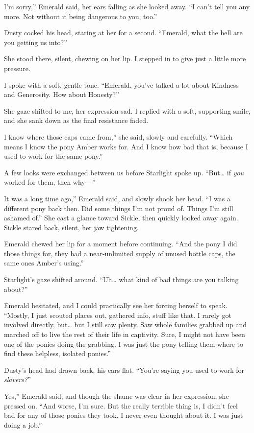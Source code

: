 \leavevmode{}I’m sorry,” Emerald said, her ears falling as she looked away. “I can’t tell you any more. Not without it being dangerous to you, too.”

Dusty cocked his head, staring at her for a second. “Emerald, what the hell are you getting us into?”

She stood there, silent, chewing on her lip. I stepped in to give just a little more pressure.

I spoke with a soft, gentle tone. “Emerald, you’ve talked a lot about Kindness and Generosity. How about Honesty?”

She gaze shifted to me, her expression sad. I replied with a soft, supporting smile, and she sank down as the final resistance faded.

\leavevmode{}I know where those caps came from,” she said, slowly and carefully. “Which means I know the pony Amber works for. And I know how bad that is, because I used to work for the same pony.”

A few looks were exchanged between us before Starlight spoke up. “But… if \textit{you} worked for them, then why—”

\leavevmode{}It was a long time ago,” Emerald said, and slowly shook her head. “I was a different pony back then. Did some things I’m not proud of. Things I’m still ashamed of.” She cast a glance toward Sickle, then quickly looked away again. Sickle stared back, silent, her jaw tightening.

Emerald chewed her lip for a moment before continuing. “And the pony I did those things for, they had a near-unlimited supply of unused bottle caps, the same ones Amber’s using.”

Starlight’s gaze shifted around. “Uh… what kind of bad things are you talking about?”

Emerald hesitated, and I could practically see her forcing herself to speak. “Mostly, I just scouted places out, gathered info, stuff like that. I rarely got involved directly, but… but I still saw plenty. Saw whole families grabbed up and marched off to live the rest of their life in captivity. Sure, I might not have been one of the ponies doing the grabbing. I was just the pony telling them where to find these helpless, isolated ponies.”

Dusty’s head had drawn back, his ears flat. “You’re saying you used to work for \textit{slavers?}”

\leavevmode{}Yes,” Emerald said, and though the shame was clear in her expression, she pressed on. “And worse, I’m sure. But the really terrible thing is, I didn’t feel bad for any of those ponies they took. I never even thought about it. I was just doing a job.”

